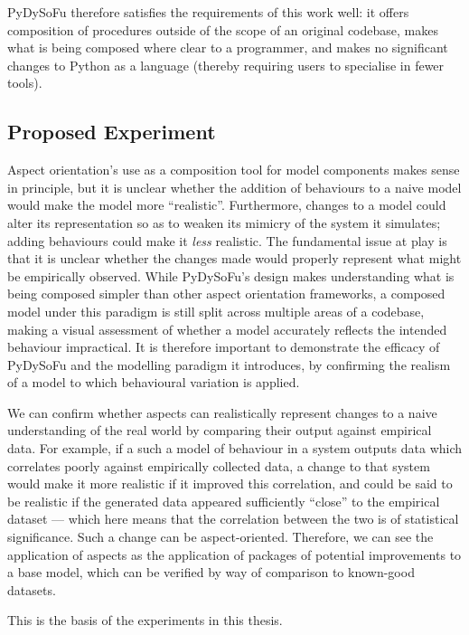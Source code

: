 PyDySoFu therefore satisfies the requirements of this work well: it offers
composition of procedures outside of the scope of an original codebase, makes
what is being composed where clear to a programmer, and makes no significant
changes to Python as a language (thereby requiring users to specialise in fewer
tools). 


\subsection{Proposed Experiment}\label{subsec:optimisation_with_aspects_experiment}

Aspect orientation's use as a composition tool for model components makes sense
in principle, but it is unclear whether the addition of behaviours to a naive
model would make the model more ``realistic''. Furthermore, changes to a model
could alter its representation so as to weaken its mimicry of the system it
simulates; adding behaviours could make it \emph{less} realistic. The
fundamental issue at play is that it is unclear whether the changes made would
properly represent what might be empirically observed. While PyDySoFu's design
makes understanding what is being composed simpler than other aspect orientation
frameworks, a composed model under this paradigm is still split across multiple
areas of a codebase, making a visual assessment of whether a model accurately
reflects the intended behaviour impractical. It is therefore important to
demonstrate the efficacy of PyDySoFu and the modelling paradigm it introduces,
by confirming the realism of a model to which behavioural variation is applied.

We can confirm whether aspects can realistically represent changes to a naive
understanding of the real world by comparing their output against empirical
data. For example, if a such a model of behaviour in a system outputs data which
correlates poorly against empirically collected data, a change to that system
would make it more realistic if it improved this correlation, and could be said
to be realistic if the generated data appeared sufficiently ``close'' to the
empirical dataset --- which here means that the correlation between the two is
of statistical significance. Such a change can be aspect-oriented. Therefore, we
can see the application of aspects as the application of packages of potential
improvements to a base model, which can be verified by way of comparison to
known-good datasets.

This is the basis of the experiments in this thesis.

